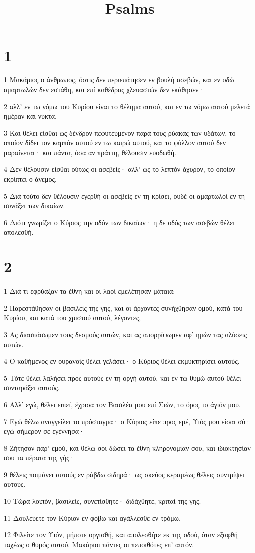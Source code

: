 

\title{Psalms}


\chapter{1}

\par 1 Μακάριος ο άνθρωπος, όστις δεν περιεπάτησεν εν βουλή ασεβών, και εν οδώ αμαρτωλών δεν εστάθη, και επί καθέδρας χλευαστών δεν εκάθησεν·
\par 2 αλλ' εν τω νόμω του Κυρίου είναι το θέλημα αυτού, και εν τω νόμω αυτού μελετά ημέραν και νύκτα.
\par 3 Και θέλει είσθαι ως δένδρον πεφυτευμένον παρά τους ρύακας των υδάτων, το οποίον δίδει τον καρπόν αυτού εν τω καιρώ αυτού, και το φύλλον αυτού δεν μαραίνεται· και πάντα, όσα αν πράττη, θέλουσιν ευοδωθή.
\par 4 Δεν θέλουσιν είσθαι ούτως οι ασεβείς· αλλ' ως το λεπτόν άχυρον, το οποίον εκρίπτει ο άνεμος.
\par 5 Διά τούτο δεν θέλουσιν εγερθή οι ασεβείς εν τη κρίσει, ουδέ οι αμαρτωλοί εν τη συνάξει των δικαίων.
\par 6 Διότι γνωρίζει ο Κύριος την οδόν των δικαίων· η δε οδός των ασεβών θέλει απολεσθή.

\chapter{2}

\par 1 Διά τι εφρύαξαν τα έθνη και οι λαοί εμελέτησαν μάταια;
\par 2 Παρεστάθησαν οι βασιλείς της γης, και οι άρχοντες συνήχθησαν ομού, κατά του Κυρίου, και κατά του χριστού αυτού, λέγοντες,
\par 3 Ας διασπάσωμεν τους δεσμούς αυτών, και ας απορρίψωμεν αφ' ημών τας αλύσεις αυτών.
\par 4 Ο καθήμενος εν ουρανοίς θέλει γελάσει· ο Κύριος θέλει εκμυκτηρίσει αυτούς.
\par 5 Τότε θέλει λαλήσει προς αυτούς εν τη οργή αυτού, και εν τω θυμώ αυτού θέλει συνταράξει αυτούς.
\par 6 Αλλ' εγώ, θέλει ειπεί, έχρισα τον Βασιλέα μου επί Σιών, το όρος το άγιόν μου.
\par 7 Εγώ θέλω αναγγείλει το πρόσταγμα· ο Κύριος είπε προς εμέ, Υιός μου είσαι σύ· εγώ σήμερον σε εγέννησα·
\par 8 Ζήτησον παρ' εμού, και θέλω σοι δώσει τα έθνη κληρονομίαν σου, και ιδιοκτησίαν σου τα πέρατα της γής·
\par 9 θέλεις ποιμάνει αυτούς εν ράβδω σιδηρά· ως σκεύος κεραμέως θέλεις συντρίψει αυτούς.
\par 10 Τώρα λοιπόν, βασιλείς, συνετίσθητε· διδάχθητε, κριταί της γης.
\par 11 Δουλεύετε τον Κύριον εν φόβω και αγάλλεσθε εν τρόμω.
\par 12 Φιλείτε τον Υιόν, μήποτε οργισθή, και απολεσθήτε εκ της οδού, όταν εξαφθή ταχέως ο θυμός αυτού. Μακάριοι πάντες οι πεποιθότες επ' αυτόν.

